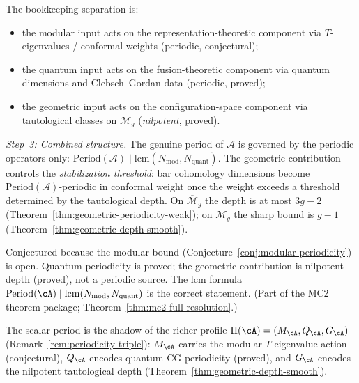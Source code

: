 \begin{evidence}
The bookkeeping separation is:
\begin{itemize}
\item the modular input acts on the representation-theoretic component
  via $T$-eigenvalues / conformal weights (periodic, conjectural);
\item the quantum input acts on the fusion-theoretic component via
  quantum dimensions and Clebsch--Gordan data (periodic, proved);
\item the geometric input acts on the configuration-space component via
  tautological classes on $\mathcal{M}_g$ (\emph{nilpotent}, proved).
\end{itemize}

\emph{Step~3: Combined structure.}
The genuine period of $\mathcal{A}$ is governed by the periodic
operators only:
$\mathrm{Period}(\mathcal{A}) \mid \mathrm{lcm}(N_{\mathrm{mod}},
N_{\mathrm{quant}})$.  The geometric contribution controls
the \emph{stabilization threshold}: bar cohomology dimensions
become $\mathrm{Period}(\mathcal{A})$-periodic in conformal weight
once the weight exceeds a threshold determined by the tautological
depth.  On $\overline{\mathcal{M}}_g$ the depth is at most $3g-2$
(Theorem~\ref{thm:geometric-periodicity-weak}); on $\mathcal{M}_g$
the sharp bound is $g-1$
(Theorem~\ref{thm:geometric-depth-smooth}).
\end{evidence}

\begin{remark}[Scope]\label{rem:periodicity-classification-scope}
Conjectured because the modular bound
(Conjecture~\ref{conj:modular-periodicity}) is open.  Quantum
periodicity is proved; the geometric contribution is nilpotent depth
(proved), not a periodic source.  The lcm formula
$\mathrm{Period}(\cA) \mid
\mathrm{lcm}(N_{\mathrm{mod}}, N_{\mathrm{quant}})$ is the correct
statement.
(Part of the MC2 theorem package; Theorem~\ref{thm:mc2-full-resolution}.)
\end{remark}

\begin{remark}\label{rem:periodicity-triple-deformation}
The scalar period is the shadow of the richer profile
$\Pi(\cA) = (M_\cA, Q_\cA, G_\cA)$
(Remark~\ref{rem:periodicity-triple}):
$M_\cA$ carries the modular $T$-eigenvalue action (conjectural),
$Q_\cA$ encodes quantum CG periodicity (proved), and $G_\cA$
encodes the nilpotent tautological depth
(Theorem~\ref{thm:geometric-depth-smooth}).
\end{remark}

